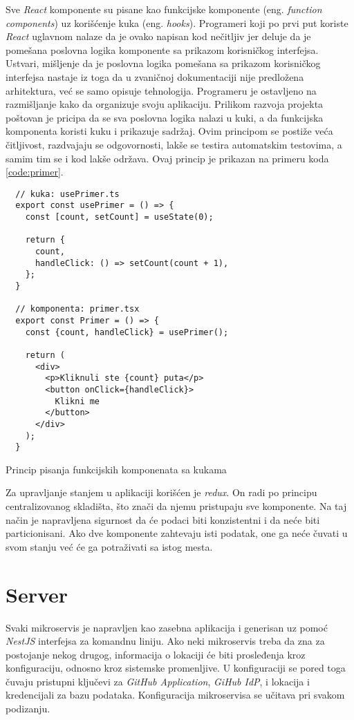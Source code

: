 Sve \textit{React} komponente su pisane kao funkcijske komponente 
(eng. \textit{function components}) uz korišćenje kuka (eng. \textit{hooks}).
Programeri koji po prvi put koriste \textit{React} uglavnom nalaze da je 
ovako napisan kod nečitljiv jer deluje da je pomešana poslovna logika komponente 
sa prikazom korisničkog interfejsa. Ustvari, mišljenje da je poslovna logika 
pomešana sa prikazom korisničkog interfejsa nastaje iz toga da u zvaničnoj 
dokumentaciji nije predložena arhitektura, već se samo opisuje tehnologija.
Programeru je ostavljeno na razmišljanje kako da organizuje svoju aplikaciju.
Prilikom razvoja projekta poštovan je pricipa da se sva poslovna logika 
nalazi u kuki, a da funkcijska komponenta koristi kuku i prikazuje sadržaj. 
Ovim principom se postiže veća čitljivost, razdvajaju se odgovornosti, lakše se testira 
automatskim testovima, a samim tim se i kod lakše održava. 
Ovaj princip je prikazan na primeru koda \ref{code:primer}.

\begin{listing}[h]
  \centering
  \begin{verbatim}
  // kuka: usePrimer.ts 
  export const usePrimer = () => {
    const [count, setCount] = useState(0);

    return {
      count,
      handleClick: () => setCount(count + 1),
    };
  }

  // komponenta: primer.tsx 
  export const Primer = () => {
    const {count, handleClick} = usePrimer();

    return (
      <div>
        <p>Kliknuli ste {count} puta</p>
        <button onClick={handleClick}>
          Klikni me
        </button>
      </div>
    );
  }
  \end{verbatim}
\caption{Princip pisanja funkcijskih komponenata sa kukama}
\label{code:primer}
\end{listing}

Za upravljanje stanjem u aplikaciji korišćen je \textit{redux}. On radi 
po principu centralizovanog skladišta, što znači da njemu pristupaju sve 
komponente. Na taj način je napravljena sigurnost da će podaci biti konzistentni 
i da neće biti particionisani. Ako dve komponente zahtevaju isti podatak, one ga neće čuvati u svom stanju 
već će ga potraživati sa istog mesta.

\section{Server}
Svaki mikroservis je napravljen kao zasebna aplikacija i generisan uz pomoć 
\textit{NestJS} interfejsa za komandnu liniju. Ako neki mikroservis treba 
da zna za postojanje nekog drugog, informacija o lokaciji će biti prosleđenja 
kroz konfiguraciju, odnosno kroz sistemske promenljive. U konfiguraciji 
se pored toga čuvaju pristupni ključevi za \textit{GitHub Application}, 
\textit{GiHub IdP}, i lokacija i kredencijali za bazu podataka. Konfiguracija 
mikroservisa se učitava pri svakom podizanju.

